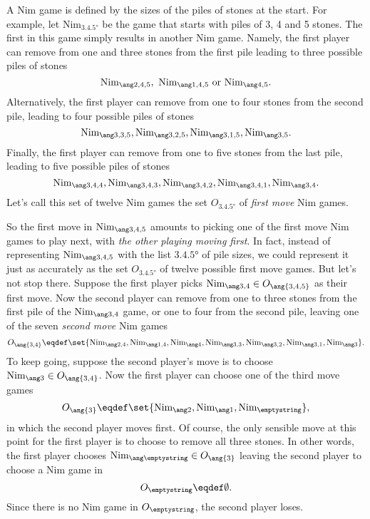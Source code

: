 \begin{definition}
A Nim game is defined by the sizes of the piles of stones at the
start.  For example, let $\text{Nim}_{\ang{3,4,5}}$ be the game that
starts with piles of 3, 4 and 5 stones.  The first in this game simply
results in another Nim game.  Namely, the first player can remove
from one and three stones from the first pile leading to three
possible piles of stones
\begin{equation}\label{nimplay3}
\nimg{2,4,5},\ \nimg{1,4,5}\ \text{or}\ \nimg{4,5}.
\end{equation}
Alternatively, the first player can remove from one to four stones
from the second pile, leading to four possible piles of stones
\begin{equation}\label{nimplay4}
\nimg{3,3,5},\nimg{3,2,5},\nimg{3,1,5},\nimg{3,5}.
\end{equation}
Finally, the first player  can remove from one to five stones
from the last pile, leading to five possible piles of stones
\begin{equation}\label{nimplay5}
\nimg{3,4,4}, \nimg{3,4,3}, \nimg{3,4,2}, \nimg{3,4,1}, \nimg{3,4}.
\end{equation}
Let's call this set of twelve Nim games the set $O_{\ang{3,4,5}}$ of
\emph{first move} Nim games.

So the first move in $\nimg{3,4,5}$ amounts to picking one of the
first move Nim games to play next, with \emph{the other playing moving
  first}.  In fact, instead of representing $\nimg{3,4,5}$ with the
list $\ang{3,4,5}$ of pile sizes, we could represent it just as
accurately as the set $O_{\ang{3,4,5}}$ of twelve possible first move
games.  But let's not stop there.  Suppose the first player picks
$\nimg{3,4} \in O_{\ang{3,4,5}}$ as their first move.  Now the second
player can remove from one to three stones from the first pile of the
$\nimg{3,4}$ game, or one to four from the second pile, leaving one of
  the seven \emph{second move} Nim games
\[
O_{\ang{3,4}} \eqdef \set{\nimg{2,4}, \nimg{1,4}, \nimg{4}, \nimg{3,3},
  \nimg{3,2}, \nimg{3,1}, \nimg{3}}.
\]
To keep going, suppose the second player's move is to choose $\nimg{3}
\in O_{\ang{3,4}}$.  Now the first player can choose one of the third move games
\[
O_{\ang{3}} \eqdef \set{\nimg{2}, \nimg{1}, \text{Nim}_{\emptystring}},
\]
in which the second player moves first.  Of course, the only sensible
move at this point for the first player is to choose to remove all
three stones.  In other words, the first
player chooses $\nimg{\emptystring} \in O_{\ang{3}}$ leaving the
second player to choose a Nim game in
\[
O_{\emptystring} \eqdef \emptyset.
\]
Since there is no Nim game in $O_{\emptystring}$, the second player
loses.


\end{definition}
